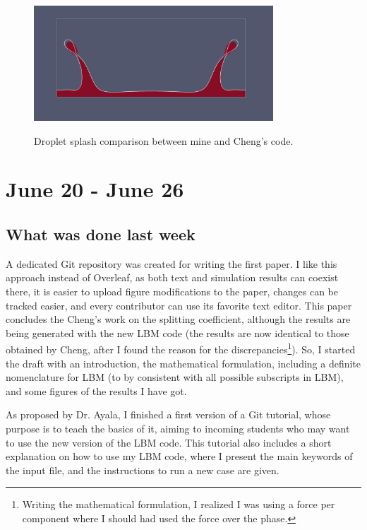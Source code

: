 \documentclass[12pt]{article}
\begin{document}
	\begin{figure}[h]
		\centering
		\caption{Droplet splash comparison between mine and Cheng's code.}
		\includegraphics[width=0.8\textwidth]{pics/splashMineCheng.png}
		\label{fig:splashCheng}
	\end{figure}

	\pagebreak
	\section*{June 20 - June 26}
	\subsection*{What was done last week}
	A dedicated Git repository was created for writing the first paper. I like this approach instead of Overleaf, as both text and simulation results can coexist there, it is easier to upload figure modifications to the paper, changes can be tracked easier, and every contributor can use its favorite text editor. This paper concludes the Cheng's work on the splitting coefficient, although the results are being generated with the new LBM code (the results are now identical to those obtained by Cheng, after I found the reason for the discrepancies\footnote{Writing the mathematical formulation, I realized I was using a force per component where I should had used the force over the phase.}). So, I started the draft with an introduction, the mathematical formulation, including a definite nomenclature for LBM (to by consistent with all possible subscripts in LBM), and some figures of the results I have got.    

	As proposed by Dr. Ayala, I finished a first version of a Git tutorial, whose purpose is to teach the basics of it, aiming to incoming students who may want to use the new version of the LBM code. This tutorial also includes a short explanation on how to use my LBM code, where I present the main keywords of the input file, and the instructions to run a new case are given.
	
\end{document}
